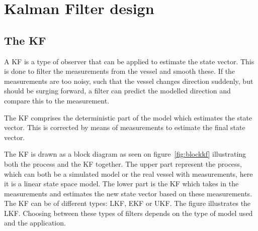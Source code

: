\section{Kalman Filter design}
\label{sec:kfdesign}

\subsection{The \acl{KF}}



A \ac{KF} is a type of observer that can be applied to estimate the state vector. This is done to filter the measurements from the vessel and smooth these. If the measurements are too noisy, such that the vessel changes direction suddenly, but should be surging forward, a filter can predict the modelled direction and compare this to the measurement.

The \ac{KF} comprises the deterministic part  of the model which estimates the state vector. This is corrected by means of measurements to estimate the final state vector.

The \ac{KF} is drawn as a block diagram as seen on figure~\vref{fig:blockkf} illustrating both the process and the \ac{KF} together. The upper part represent the process, which can both be a simulated model or the real vessel with measurements, here it is a linear state space model. The lower part is the \ac{KF} which takes in the measurements and estimates the new state vector based on these measurements. The \ac{KF} can be of different types: \ac{LKF}, \ac{EKF} or \ac{UKF}. The figure illustrates the \ac{LKF}. Choosing between these types of filters depends on the type of model used and the application. 

